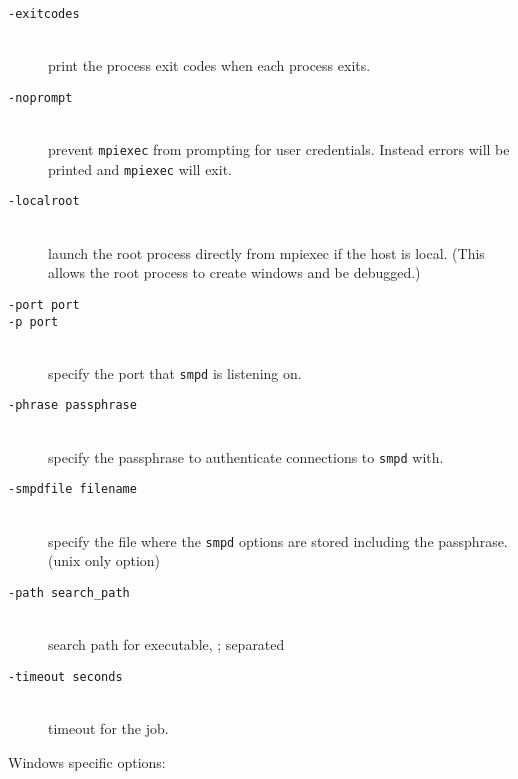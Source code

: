 \documentclass[dvipdfm,11pt]{article}
\begin{document}
\begin{description}
\item[\texttt{-exitcodes}]\mbox{}\\
  print the process exit codes when each process exits.
\item[\texttt{-noprompt}]\mbox{}\\
  prevent \texttt{mpiexec} from prompting for user credentials.  Instead errors will
be printed and \texttt{mpiexec} will exit.
\item[\texttt{-localroot}]\mbox{}\\
  launch the root process directly from mpiexec if the host is local.
  (This allows the root process to create windows and be debugged.)
\item[\texttt{-port port}]
\item[\texttt{-p port}]\mbox{}\\
  specify the port that \texttt{smpd} is listening on.
\item[\texttt{-phrase passphrase}]\mbox{}\\
  specify the passphrase to authenticate connections to \texttt{smpd} with.
\item[\texttt{-smpdfile filename}]\mbox{}\\
  specify the file where the \texttt{smpd} options are stored including the 
passphrase. (unix only option)
\item[\texttt{-path search\_path}]\mbox{}\\
  search path for executable, ; separated
\item[\texttt{-timeout seconds}]\mbox{}\\
  timeout for the job. 
\end{description}
Windows specific options:
\end{document}
